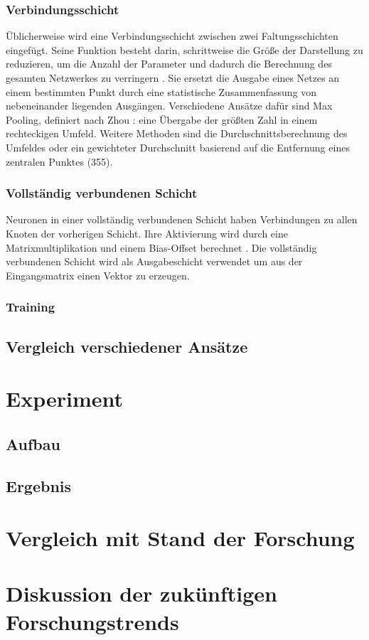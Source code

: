 \documentclass[twosided,a4,10pt]{article}
\begin{document}
\begin{multicols}{2}
		\subsubsection*{Verbindungsschicht}
		Üblicherweise wird eine Verbindungsschicht zwischen zwei Faltungsschichten eingefügt. Seine Funktion besteht darin, schrittweise die Größe der Darstellung zu reduzieren, um die Anzahl der Parameter und dadurch die Berechnung des gesamten Netzwerkes zu verringern \cite{karpathy}. Sie ersetzt die Ausgabe eines Netzes an einem bestimmten Punkt durch eine statistische Zusammenfassung von nebeneinander liegenden Ausgängen. Verschiedene Ansätze dafür sind Max Pooling, definiert nach Zhou \cite{zhou}: eine Übergabe der größten Zahl in einem rechteckigen Umfeld. Weitere Methoden sind die Durchschnittsberechnung des Umfeldes oder ein gewichteter Durchschnitt basierend auf die Entfernung eines zentralen Punktes \cite{goodfellow}(355).
		
		\subsubsection*{Vollständig verbundenen Schicht}
		Neuronen in einer vollständig verbundenen Schicht haben Verbindungen zu allen Knoten der vorherigen Schicht. Ihre Aktivierung wird durch eine Matrixmultiplikation und einem Bias-Offset berechnet \cite{karpathy}. Die vollständig verbundenen Schicht wird als Ausgabeschicht verwendet um aus der Eingangsmatrix einen Vektor zu erzeugen.
		
		\subsubsection*{Training}
		
		\subsection{Vergleich verschiedener Ansätze}
		
		\section{Experiment}
		
		\subsection{Aufbau}
		
		\subsection{Ergebnis}
		
		\section{Vergleich mit Stand der Forschung}
		
		\section{Diskussion der zukünftigen Forschungstrends}
		
		
		
		
	\end{multicols}
	
\end{document}
